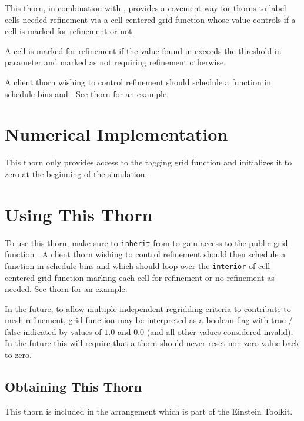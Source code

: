 This thorn, in combination with , provides a covenient way for
 thorns to label cells needed refinement via a cell centered
grid function  whose value controls if a cell is marked
for refinement or not.

A cell is marked for refinement if the value found in 
exceeds the threshold in parameter 
and marked as not requiring refinement otherwise.

A client thorn wishing to control refinement should schedule a function in
schedule bins  and . See thorn
 for an example.

\section{Numerical Implementation}

This thorn only provides access to the tagging grid function
 and initializes it to zero at the beginning of the
simulation.

\section{Using This Thorn}

To use this thorn, make sure to \texttt{inherit} from  to
gain access to the public grid function . 
A client thorn wishing to control refinement should then  schedule a function in
schedule bins  and  which should loop over
the \texttt{interior} of cell centered grid function 
marking each cell for refinement or no refinement as needed. See thorn
 for an example.

In the future, to allow multiple independent regridding criteria to contribute
to mesh refinement, grid function  may be interpreted as a
boolean flag with true / false indicated by values of $1.0$ and $0.0$ (and all
other values considered invalid). In the future this will require that a thorn
should never reset non-zero value back to zero.

\subsection{Obtaining This Thorn}

This thorn is included in the  arrangement which is part of the
Einstein Toolkit. 

